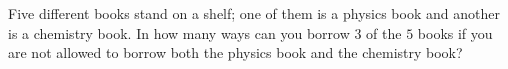 Five different books stand on a shelf; one of them is a physics book and another is a chemistry book. In how many ways can you borrow $3$ of the $5$ books if you are not allowed to borrow both the physics book and the chemistry book?
